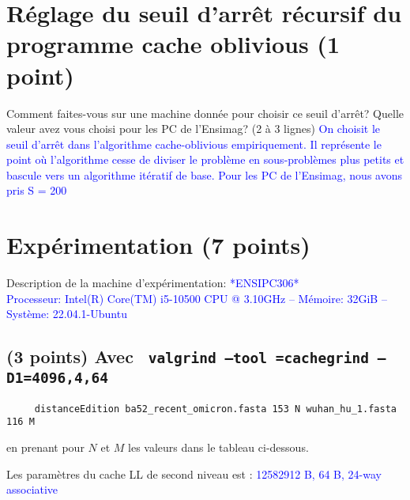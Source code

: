 \documentclass[10pt,a4paper]{article}
\begin{document}
\section{Réglage du seuil d'arrêt récursif du programme cache oblivious  (1 point)} 
Comment faites-vous sur une machine donnée pour choisir ce seuil d'arrêt? Quelle valeur avez vous choisi pour les
PC de l'Ensimag? (2 à 3 lignes) 
\textcolor{blue}{
  On choisit le seuil d'arrêt dans l'algorithme cache-oblivious empiriquement.
  Il représente le point où l'algorithme cesse de diviser le problème en sous-problèmes plus petits et bascule vers un algorithme itératif de base.
  Pour les PC de l'Ensimag, nous avons pris S = 200
}

\section{Expérimentation (7 points)}

Description de la machine d'expérimentation:    \textcolor{blue}{ *ENSIPC306*\\
Processeur: Intel(R) Core(TM) i5-10500 CPU @ 3.10GHz --
Mémoire: 32GiB --
Système: 22.04.1-Ubuntu }

\subsection{(3 points) Avec {\tt 
	valgrind --tool =cachegrind --D1=4096,4,64
}} 
\begin{verbatim}
     distanceEdition ba52_recent_omicron.fasta 153 N wuhan_hu_1.fasta 116 M 
\end{verbatim}
en prenant pour $N$ et $M$ les valeurs dans le tableau ci-dessous.

Les paramètres du cache LL de second niveau est :   \textcolor{blue}{12582912 B, 64 B, 24-way associative} \\
\end{document}

